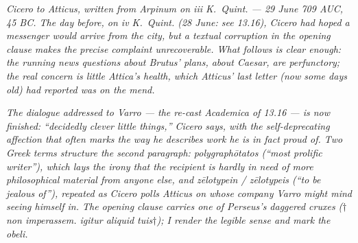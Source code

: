 
\textit{Cicero to Atticus, written from Arpinum on
\textit{iii K.\ Quint.} --- 29 June 709 AUC, 45 BC. The
day before, on \textit{iv K.\ Quint.} (28 June: see
13.16), Cicero had hoped a messenger would arrive
from the city, but a textual corruption in the
opening clause makes the precise complaint
unrecoverable. What follows is clear enough: the
running news questions about Brutus' plans, about
Caesar, are perfunctory; the real concern is little
Attica's health, which Atticus' last letter (now
some days old) had reported was on the mend.}

\textit{The dialogue addressed to Varro --- the
re-cast \textit{Academica} of 13.16 --- is now
finished: ``decidedly clever little things,'' Cicero
says, with the self-deprecating affection that often
marks the way he describes work he is in fact proud
of. Two Greek terms structure the second paragraph:
\textit{polygraph\=otatos} (``most prolific writer''),
which lays the irony that the recipient is hardly in
need of more philosophical material from anyone
else, and \textit{z\=elotypein} / \textit{z\=elotypeis}
(``to be jealous of''), repeated as Cicero polls
Atticus on whose company Varro might mind seeing
himself in. The opening clause carries one of
Perseus's daggered cruxes (\textit{$\dagger$non
imperassem. igitur aliquid tuis$\dagger$}); I render
the legible sense and mark the obeli.}
